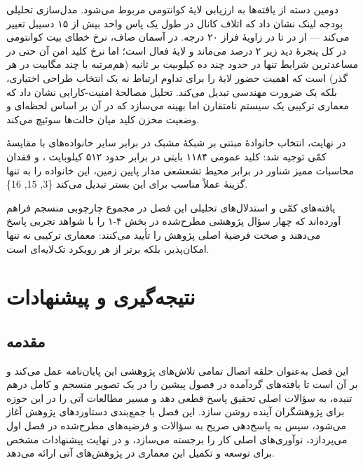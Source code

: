 \documentclass[a4paper,14pt]{extreport}
\begin{document}
دومین دسته از یافته‌ها به ارزیابی لایهٔ کوانتومی مربوط می‌شود. مدل‌سازی تحلیلی بودجه لینک نشان داد که اتلاف کانال در طول یک پاس واحد بیش از ۱۵ دسیبل تغییر می‌کند --- از  در  تا  در زاویهٔ فراز ۲۰ درجه. در آسمان صاف، نرخ خطای بیت کوانتومی در کل پنجرهٔ دید زیر ۲ درصد می‌ماند و لایهٔ  فعال است؛ اما نرخ کلید امن آن حتی در مساعدترین شرایط تنها در حدود چند ده کیلوبیت بر ثانیه (هم‌مرتبه با چند مگابیت در هر گذر) است که اهمیت حضور لایهٔ  را برای تداوم ارتباط نه یک انتخاب طراحی اختیاری، بلکه یک ضرورت مهندسی تبدیل می‌کند. تحلیل مصالحهٔ امنیت-کارایی نشان داد که معماری ترکیبی یک سیستم نامتقارن اما بهینه می‌سازد که در آن  بر اساس  لحظه‌ای و وضعیت مخزن کلید میان حالت‌ها سوئیچ می‌کند.

در نهایت، انتخاب خانوادهٔ مبتنی بر شبکهٔ مشبک در برابر سایر خانواده‌های  با مقایسهٔ کمّی توجیه شد: کلید عمومی ۱۱۸۴ بایتی  در برابر حدود ۵۱۲ کیلوبایت ، و فقدان محاسبات ممیز شناور در برابر محیط تشعشعی مدار پایین زمین، این خانواده را به تنها گزینهٔ عملاً مناسب برای این بستر تبدیل می‌کند \{3, 15, 16\}.

یافته‌های کمّی و استدلال‌های تحلیلی این فصل در مجموع چارچوبی منسجم فراهم آورده‌اند که چهار سؤال پژوهشی مطرح‌شده در بخش ۴-۱ را با شواهد تجربی پاسخ می‌دهند و صحت فرضیهٔ اصلی پژوهش را تأیید می‌کنند: معماری ترکیبی  نه تنها امکان‌پذیر، بلکه برتر از هر رویکرد تک‌لایه‌ای است.

\chapter{نتیجه‌گیری و پیشنهادات}
\setcounter{figure}{0}
\setcounter{table}{0}
\setcounter{equation}{0}

\section{مقدمه}

این فصل به‌عنوان حلقه اتصال تمامی تلاش‌های پژوهشی این پایان‌نامه عمل می‌کند و بر آن است تا یافته‌های گردآمده در فصول پیشین را در یک تصویر منسجم و کامل درهم تنیده، به سؤالات اصلی تحقیق پاسخ قطعی دهد و مسیر مطالعات آتی را در این حوزه برای پژوهشگران آینده روشن سازد. این فصل با جمع‌بندی دستاوردهای پژوهش آغاز می‌شود، سپس به پاسخ‌دهی صریح به سؤالات و فرضیه‌های مطرح‌شده در فصل اول می‌پردازد، نوآوری‌های اصلی کار را برجسته می‌سازد، و در نهایت پیشنهادات مشخص برای توسعه و تکمیل این معماری در پژوهش‌های آتی ارائه می‌دهد.
\end{document}
